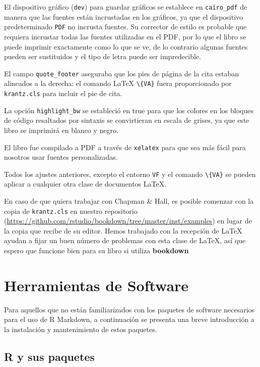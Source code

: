 \documentclass[12pt,]{krantz}
\theoremstyle{definition}
\theoremstyle{definition}
\theoremstyle{remark}
\begin{document}
El dispositivo gráfico (\texttt{dev}) para guardar gráficos se establece
en \texttt{cairo\_pdf} de manera que las fuentes están incrustadas en
los gráficos, ya que el dispositivo predeterminado \texttt{PDF} no
incrusta fuentes. Su corrector de estilo es probable que requiera
incrustar todas las fuentes utilizadas en el PDF, por lo que el libro se
puede imprimir exactamente como lo que se ve, de lo contrario algunas
fuentes pueden ser sustituidos y el tipo de letra puede ser
impredecible.

El campo \texttt{quote\_footer} aseguraba que los pies de página de la
cita estaban alineados a la derecha: el comando LaTeX
\texttt{\textbackslash{}\{VA\}} fuera proporcionado por
\texttt{krantz.cls} para incluir el pie de cita.

La opción \texttt{highlight\_bw} se estableció en true para que los
colores en los bloques de código resaltados por sintaxis se convirtieran
en escala de grises, ya que este libro se imprimirá en blanco y negro.

El libro fue compilado a PDF a través de \texttt{xelatex} para que sea
más fácil para nosotros usar fuentes personalizadas.

Todos los ajustes anteriores, excepto el entorno \texttt{VF} y el
comando \texttt{\textbackslash{}\{VA\}} se pueden aplicar a cualquier
otra clase de documentos LaTeX.

En caso de que quiera trabajar con Chapman \& Hall, es posible comenzar
con la copia de \texttt{krantz.cls} en nuestro repositorio
(\url{https://github.com/rstudio/bookdown/tree/master/inst/examples}) en
lugar de la copia que recibe de su editor. Hemos trabajado con la
recepción de LaTeX ayudan a fijar un buen número de problemas con esta
clase de LaTeX, así que espero que funcione bien para su libro si
utiliza \textbf{bookdown}

\cleardoublepage 

\appendix {}


\chapter{Herramientas de Software}\label{herramientas-de-software}

Para aquellos que no están familiarizados con los paquetes de software
necesarios para el uso de R Markdown, a continuación se presenta una
breve introducción a la instalación y mantenimiento de estos paquetes.

\section{R y sus paquetes}\label{r-y-sus-paquetes}
\end{document}
